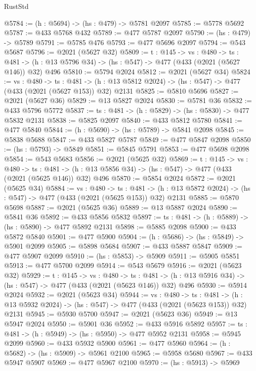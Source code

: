 \begin{lexlean}{RustStd}
\begin{coremodule}
@5784 := (h : @5694) -> (hs : @479) -> @5781 @2097
@5785 := @5778 @5692
@5787 := @433 @5768 @432
@5789 := @477 @5787 @2097
@5790 := (hs : @479) -> @5789
@5791 := @5785 @476
@5793 := @477 @5696 @2097
@5794 := @543 @5687
@5796 := @2021 (@5627 @32)
@5809 := {t : @145} ->
  {vs : @480} ->
  {ts : @481} -> (h : @13 @5796 @34) -> (hs : @547) -> @477 (@433 (@2021 (@5627 @146)) @32) @496
@5810 := @5794 @2024
@5812 := @2021 (@5627 @34)
@5824 := {vs : @480} ->
  {ts : @481} -> (h : @13 @5812 @2024) -> (hs : @547) -> @477 (@433 (@2021 (@5627 @153)) @32) @2131
@5825 := @5810 @5696
@5827 := @2021 (@5627 @36)
@5829 := @13 @5827 @2024
@5830 := @5781 @36
@5832 := @433 @5796 @5772
@5837 := {ts : @481} -> (h : @5829) -> (hs : @5830) -> @477 @5832 @2131
@5838 := @5825 @2097
@5840 := @433 @5812 @5780
@5841 := @477 @5840
@5844 := (h : @5690) -> (hs : @5789) -> @5841 @2098
@5845 := @5838 @5688
@5847 := @433 @5827 @5787
@5849 := @477 @5847 @2098
@5850 := (hs : @5793) -> @5849
@5851 := @5845 @5791
@5853 := @477 @5698 @2098
@5854 := @543 @5683
@5856 := @2021 (@5625 @32)
@5869 := {t : @145} ->
  {vs : @480} ->
  {ts : @481} -> (h : @13 @5856 @34) -> (hs : @547) -> @477 (@433 (@2021 (@5625 @146)) @32) @496
@5870 := @5854 @2024
@5872 := @2021 (@5625 @34)
@5884 := {vs : @480} ->
  {ts : @481} -> (h : @13 @5872 @2024) -> (hs : @547) -> @477 (@433 (@2021 (@5625 @153)) @32) @2131
@5885 := @5870 @5698
@5887 := @2021 (@5625 @36)
@5889 := @13 @5887 @2024
@5890 := @5841 @36
@5892 := @433 @5856 @5832
@5897 := {ts : @481} -> (h : @5889) -> (hs : @5890) -> @477 @5892 @2131
@5898 := @5885 @2098
@5900 := @433 @5872 @5840
@5901 := @477 @5900
@5904 := (h : @5686) -> (hs : @5849) -> @5901 @2099
@5905 := @5898 @5684
@5907 := @433 @5887 @5847
@5909 := @477 @5907 @2099
@5910 := (hs : @5853) -> @5909
@5911 := @5905 @5851
@5913 := @477 @5700 @2099
@5914 := @543 @5679
@5916 := @2021 (@5623 @32)
@5929 := {t : @145} ->
  {vs : @480} ->
  {ts : @481} -> (h : @13 @5916 @34) -> (hs : @547) -> @477 (@433 (@2021 (@5623 @146)) @32) @496
@5930 := @5914 @2024
@5932 := @2021 (@5623 @34)
@5944 := {vs : @480} ->
  {ts : @481} -> (h : @13 @5932 @2024) -> (hs : @547) -> @477 (@433 (@2021 (@5623 @153)) @32) @2131
@5945 := @5930 @5700
@5947 := @2021 (@5623 @36)
@5949 := @13 @5947 @2024
@5950 := @5901 @36
@5952 := @433 @5916 @5892
@5957 := {ts : @481} -> (h : @5949) -> (hs : @5950) -> @477 @5952 @2131
@5958 := @5945 @2099
@5960 := @433 @5932 @5900
@5961 := @477 @5960
@5964 := (h : @5682) -> (hs : @5909) -> @5961 @2100
@5965 := @5958 @5680
@5967 := @433 @5947 @5907
@5969 := @477 @5967 @2100
@5970 := (hs : @5913) -> @5969

\end{coremodule}
\end{lexlean}

